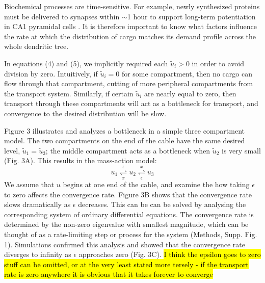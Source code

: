 \documentclass[11pt]{wlpeerj}
\begin{document}
Biochemical processes are time-sensitive.
For example, newly synthesized proteins must be delivered to synapses within $\sim$1 hour to support long-term potentiation in CA1 pyramidal cells \citep{Frey_1997,Frey_1998}.
It is therefore important to know what factors influence the rate at which the distribution of cargo matches its demand profile across the whole dendritic tree.

In equations (4) and (5), we implicitly required each $\tilde{u}_i > 0$ in order to avoid division by zero.
Intuitively, if $\tilde{u}_i = 0$ for some compartment, then no cargo can flow through that compartment, cutting of more peripheral compartments from the transport system.
Similarly, if certain $\tilde{u}_i$ are nearly equal to zero, then transport through these compartments will act as a bottleneck for transport, and convergence to the desired distribution will be slow.

Figure 3 illustrates and analyzes a bottleneck in a simple three compartment model.
The two compartments on the end of the cable have the same desired level, $\tilde{u}_1 = \tilde{u}_3$; the middle compartment acts as a bottleneck when $\tilde{u}_2$ is very small (Fig. 3A).
This results in the mass-action model:
\begin{equation}
u_1 \underset{x}{\overset{\epsilon}{\rightleftharpoons}} u_2 \underset{\epsilon}{\overset{x}{\rightleftharpoons}} u_3
\end{equation}
We assume that $u$ begins at one end of the cable, and examine the how taking $\epsilon$ to zero affects the convergence rate.
Figure 3B shows that the convergence rate slows dramatically as $\epsilon$ decreases.
This can be can be solved by analysing the corresponding system of ordinary differential equations. The convergence rate is determined by the non-zero eigenvalue with smallest magnitude, which can be thought of as a rate-limiting step or process for the system (Methods, Supp. Fig. 1).
Simulations confirmed this analysis and showed that the convergence rate diverges to infinity as $\epsilon$ approaches zero (Fig. 3C).
\hl{I think the epsilon goes to zero stuff can be omitted, or at the very least stated more tersely - if the transport rate is zero anywhere it is obvious that it takes forever to converge}
\end{document}
